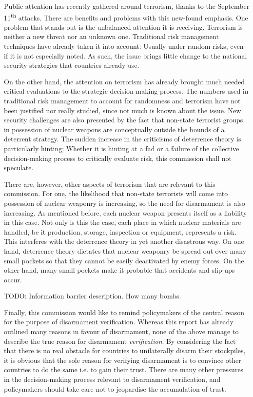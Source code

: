 \documentclass[twoside,titlepage,11pt,twocolumn,a4paper]{article}
\begin{document}
Public attention has recently gathered around terrorism, thanks to the
September 11\textsuperscript{th} attacks. There are benefits and
problems with this new-found emphasis. One problem that stands out is
the unbalanced attention it is receiving. Terrorism is neither a new
threat nor an unknown one. Traditional risk management techniques have
already taken it into account: Usually under random risks, even if it
is not especially noted. As such, the issue brings little change to
the national security strategies that countries already use.

On the other hand, the attention on terrorism has already brought much
needed critical evaluations to the strategic decision-making
process. The numbers used in traditional risk management to account
for randomness and terrorism have not been justified nor really
studied, since not much is known about the issue. New security
challenges are also presented by the fact that non-state terrorist
groups in possession of nuclear weapons are conceptually outside the
bounds of a deterrent strategy. The sudden increase in the criticisms
of deterrence theory is particularly hinting; Whether it is hinting at
a fad or a failure of the collective decision-making process to
critically evaluate risk, this commission shall not speculate.

There are, however, other aspects of terrorism that are relevant to
this commission. For one, the likelihood that non-state terrorists
will come into possession of nuclear weaponry is increasing, so the
need for disarmament is also increasing. As mentioned before, each
nuclear weapon presents itself as a liability in this case. Not only
is this the case, each place in which nuclear materials are handled,
be it production, storage, inspection or equipment, represents a
risk. This interferes with the deterrence theory in yet another
disastrous way. On one hand, deterrence theory dictates that nuclear
weaponry be spread out over many small pockets so that they cannot be
easily deactivated by enemy forces. On the other hand, many small
pockets make it probable that accidents and slip-ups occur.

TODO: Information barrier description. How many bombs.

Finally, this commission would like to remind policymakers of the
central reason for the purpose of disarmament verification. Whereas
this report has already outlined many reasons in favour of
disarmament, none of the above manage to describe the true reason for
disarmament \emph{verification}. By considering the fact that there is
no real obstacle for countries to unilaterally disarm their
stockpiles, it is obvious that the sole reason for verifying
disarmament is to convince other countries to do the same i.e. to gain
their trust. There are many other pressures in the decision-making
process relevant to disarmament verification, and policymakers should
take care not to jeopardise the accumulation of trust.
\end{document}
